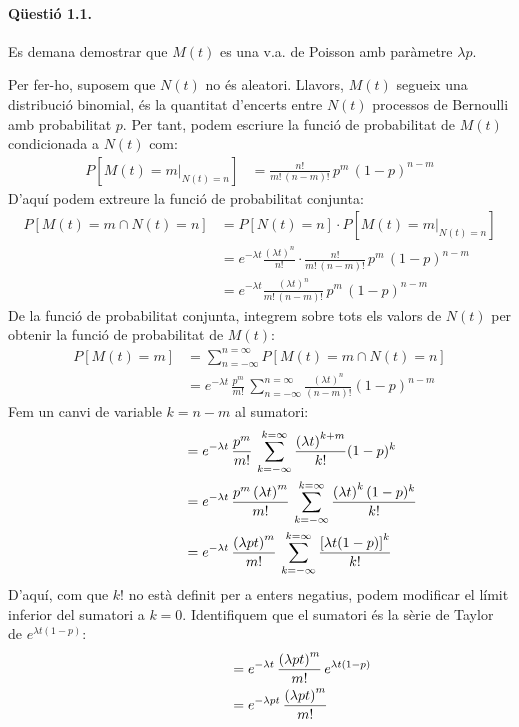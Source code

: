 \documentclass[catalan]{scrartcl}
\begin{document}
\paragraph{Qüestió 1.1.}

Es demana demostrar que $M(t)$ es una v.a. de Poisson amb paràmetre $\lambda p$.

Per fer-ho, suposem que $N(t)$ no és aleatori. Llavors, $M(t)$ segueix
una distribució binomial, és la quantitat d'encerts entre $N(t)$ processos de Bernoulli amb probabilitat $p$. Per tant, podem escriure la funció de
probabilitat de $M(t)$ condicionada a $N(t)$ com:
%
\begin{align}
  P\left[ M(t) = m \Bigr\rvert_{N(t) = n} \right] &=
    \frac{n!}{m! \, (n - m)!} \, p^m \, (1-p)^{n-m}
\end{align}
%
D'aquí podem extreure la funció de probabilitat conjunta:
%
\begin{align}
  P[ M(t) = m \cap N(t) = n ] &=
    P[N(t) = n] \cdot P\left[ M(t) = m \Bigr\rvert_{N(t) = n} \right]
\\
  &=
    e^{-\lambda t} \frac{\left(\lambda t\right)^n}{n!}
    \cdot
    \frac{n!}{m! \, (n - m)!} \, p^m \, (1-p)^{n-m}
\\
  &=
    e^{-\lambda t} \frac{\left(\lambda t\right)^n}{m! \, (n - m)!}
    \, p^m \, (1-p)^{n-m}
\end{align}
%
De la funció de probabilitat conjunta, integrem sobre tots els valors de
$N(t)$ per obtenir la funció de probabilitat de $M(t)$:
%
\begin{align}
  P[ M(t) = m ] &=
    \sum_{n = -\infty}^{n = \infty} P[ M(t) = m \cap N(t) = n ]
\\
  &=
    e^{-\lambda t} \, \frac{p^m}{m!} \, \sum_{n = -\infty}^{n = \infty}
    \frac{\left(\lambda t\right)^n}{(n - m)!} (1-p)^{n-m}
\end{align}
%
Fem un canvi de variable $k = n - m$ al sumatori:
%
\begin{align}
  \hphantom{ P[ M(t) = m ] } &=
    e^{-\lambda t} \, \frac{p^m}{m!} \, \sum_{k = -\infty}^{k = \infty}
    \frac{\left(\lambda t\right)^{k+m} }{k!} (1-p)^k
\\
  &=
    e^{-\lambda t} \, \frac{p^m \left(\lambda t\right)^m}{m!}
    \, \sum_{k = -\infty}^{k = \infty}
    \frac{\left(\lambda t\right)^{k} (1-p)^k }{k!}
\\
  &=
    e^{-\lambda t} \, \frac{\left(\lambda p t\right)^m}{m!}
    \, \sum_{k = -\infty}^{k = \infty}
    \frac{\left[\lambda t (1-p)\right]^{k} }{k!}
\end{align}
%
D'aquí, com que $k!$ no està definit per a enters negatius, podem modificar el límit inferior del sumatori a $k = 0$. Identifiquem que el sumatori és la sèrie de Taylor de $e^{\lambda t (1-p)}$:
%
\begin{align}
  \hphantom{ P[ M(t) = m ] } &=
    e^{-\lambda t} \, \frac{\left(\lambda p t\right)^m}{m!}
    \, e^{\lambda t (1-p)}
\\
  &=
    e^{-\lambda p t} \, \frac{\left(\lambda p t\right)^m}{m!}
\end{align}
\end{document}
